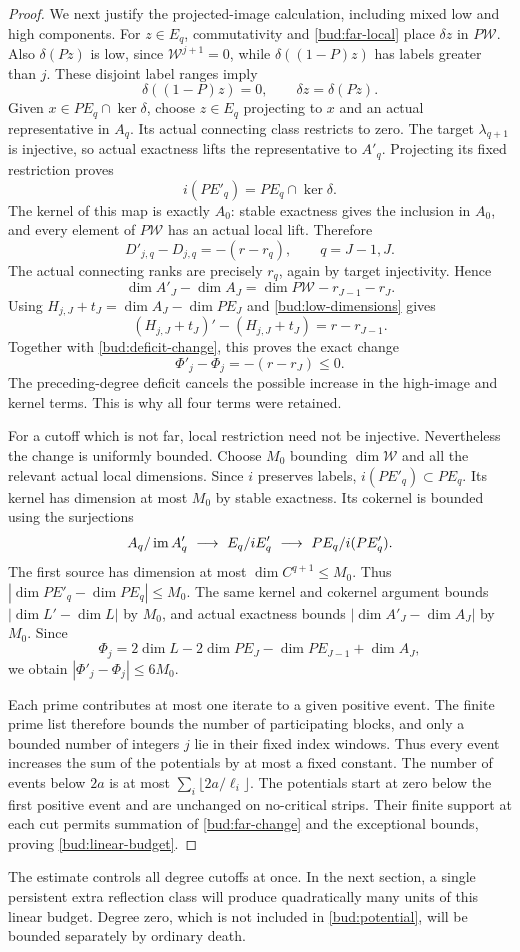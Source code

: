 \begin{proof}
We next justify the projected-image calculation, including mixed low
and high components. For $z\in E_q$, commutativity and
\eqref{bud:far-local} place $\delta z$ in $P\mathcal W$.
Also $\delta(Pz)$ is low, since $\mathcal W^{j+1}=0$, while
$\delta((1-P)z)$ has labels greater than $j$. These disjoint label
ranges imply
\[
 \delta((1-P)z)=0,\qquad \delta z=\delta(Pz).
\]
Given $x\in PE_q\cap\ker\delta$, choose $z\in E_q$ projecting to $x$
and an actual representative in $A_q$. Its actual connecting class
restricts to zero. The target $\lambda_{q+1}$ is injective, so actual
exactness lifts the representative to $A'_q$. Projecting its fixed
restriction proves
\[
 i(PE'_q)=PE_q\cap\ker\delta.
\]
The kernel of this map is exactly $A_0$: stable exactness gives the
inclusion in $A_0$, and every element of $P\mathcal W$ has an actual
local lift. Therefore
\begin{equation}\label{bud:deficit-change}
 D'_{j,q}-D_{j,q}=-(r-r_q),\qquad q=J-1,J.
\end{equation}
The actual connecting ranks are precisely $r_q$, again by target
injectivity. Hence
\[
 \dim A'_J-\dim A_J=\dim P\mathcal W-r_{J-1}-r_J.
\]
Using $H_{j,J}+t_J=\dim A_J-\dim PE_J$ and
\eqref{bud:low-dimensions} gives
\[
 (H_{j,J}+t_J)'-(H_{j,J}+t_J)=r-r_{J-1}.
\]
Together with \eqref{bud:deficit-change}, this proves the exact change
\begin{equation}\label{bud:far-change}
 \Phi'_j-\Phi_j=-(r-r_J)\le0.
\end{equation}
The preceding-degree deficit cancels the possible increase in the
high-image and kernel terms. This is why all four terms were retained.

For a cutoff which is not far, local restriction need not be injective.
Nevertheless the change is uniformly bounded. Choose $M_0$ bounding
$\dim\mathcal W$ and all the relevant actual local dimensions. Since
$i$ preserves labels, $i(PE'_q)\subset PE_q$. Its kernel has dimension
at most $M_0$ by stable exactness. Its cokernel is bounded using the
surjections
\[
 A_q/\operatorname{im} A'_q\ \longrightarrow\ E_q/iE'_q
 \ \longrightarrow\ PE_q/i(PE'_q).
\]
The first source has dimension at most $\dim C^{q+1}\le M_0$.
Thus $|\dim PE'_q-\dim PE_q|\le M_0$.
The same kernel and cokernel argument bounds
$|\dim L'-\dim L|$ by $M_0$, and actual exactness bounds
$|\dim A'_J-\dim A_J|$ by $M_0$. Since
\[
 \Phi_j=2\dim L-2\dim PE_J-\dim PE_{J-1}+\dim A_J,
\]
we obtain $|\Phi'_j-\Phi_j|\le6M_0$.

Each prime contributes at most one iterate to a given positive event.
The finite prime list therefore bounds the number of participating
blocks, and only a bounded number of integers $j$ lie in their fixed
index windows. Thus every event increases the sum of the potentials by
at most a fixed constant. The number of events below $2a$ is at most
$\sum_i\lfloor2a/\ell_i\rfloor$. The potentials start at zero below
the first positive event and are unchanged on no-critical strips.
Their finite support at each cut permits summation of
\eqref{bud:far-change} and the exceptional bounds, proving
\eqref{bud:linear-budget}.
\end{proof}

The estimate controls all degree cutoffs at once. In the next section,
a single persistent extra reflection class will produce quadratically
many units of this linear budget. Degree zero, which is not included in
\eqref{bud:potential}, will be bounded separately by ordinary death.
